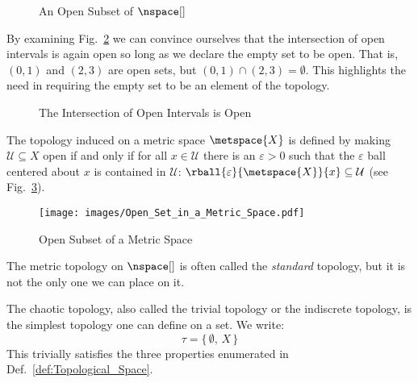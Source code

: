 \documentclass{book}                                                           %
\begin{document}
                \begin{figure}[H]
                    \centering
                    \captionsetup{type=figure}
                    
                    \caption{An Open Subset of $\nspace[]$}
                    \label{fig:Open_Subset_of_R}
                \end{figure}
                By examining Fig.~\ref{fig:Open_Interval_Intersect_is_Open} we
                can convince ourselves that the intersection of open intervals
                is again open so long as we declare the empty set to be open.
                That is, $(0,1)$ and $(2,3)$ are open sets, but
                $(0,1)\cap(2,3)=\emptyset$. This highlights the need in
                requiring the empty set to be an element of the topology.
                \begin{figure}[H]
                    \centering
                    \captionsetup{type=figure}
                    
                    \caption{The Intersection of Open Intervals is Open}
                    \label{fig:Open_Interval_Intersect_is_Open}
                \end{figure}
                \begin{example}
                    The topology induced on a metric space $\metspace{X}$ is
                    defined by making $\mathcal{U}\subseteq{X}$ open if and only
                    if for all $x\in\mathcal{U}$ there is an $\varepsilon>0$
                    such that the $\varepsilon$ ball centered about $x$ is
                    contained in $\mathcal{U}$:
                    $\rball{\varepsilon}{\metspace{X}}{x}\subseteq\mathcal{U}$
                    (see Fig.~\ref{fig:Open_Subset_Metric_Space}).%
                \end{example}
                \begin{figure}[H]
                    \centering
                    \captionsetup{type=figure}
                    \texttt{[image: images/Open\_Set\_in\_a\_Metric\_Space.pdf]}
                    \caption{Open Subset of a Metric Space}
                    \label{fig:Open_Subset_Metric_Space}
                \end{figure}
                The metric topology on $\nspace[]$ is often called the
                \textit{standard} topology, but it is not the only one we can
                place on it.
                \begin{example}
                    The chaotic topology, also called the trivial topology or
                    the indiscrete topology, is the simplest topology one can
                    define on a set. We write:
                    \begin{equation}
                        \tau=\{\,\emptyset,\,X\,\}
                    \end{equation}
                    This trivially satisfies the three properties enumerated in
                    Def.~\ref{def:Topological_Space}.
                \end{example}
\end{document}
